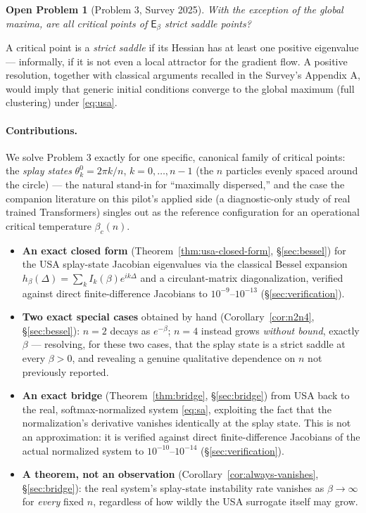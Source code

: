 \documentclass[11pt]{article}
\newtheorem*{openproblem}{Open Problem}
\begin{document}
\begin{openproblem}[Problem 3, Survey 2025]
With the exception of the global maxima, are all critical points of $\mathsf{E}_\beta$ strict saddle points?
\end{openproblem}

A critical point is a \emph{strict saddle} if its Hessian has at least one positive eigenvalue --- informally, if it is not even a local attractor for the gradient flow. A positive resolution, together with classical arguments recalled in the Survey's Appendix A, would imply that generic initial conditions converge to the global maximum (full clustering) under \eqref{eq:usa}.

\paragraph{Contributions.} We solve Problem 3 exactly for one specific, canonical family of critical points: the \emph{splay states} $\theta_k^0 = 2\pi k/n$, $k=0,\dots,n-1$ (the $n$ particles evenly spaced around the circle) --- the natural stand-in for ``maximally dispersed,'' and the case the companion literature on this pilot's applied side (a diagnostic-only study of real trained Transformers) singles out as the reference configuration for an operational critical temperature $\beta_c(n)$.
\begin{itemize}[leftmargin=*]
    \item \textbf{An exact closed form} (Theorem~\ref{thm:usa-closed-form}, \S\ref{sec:bessel}) for the USA splay-state Jacobian eigenvalues via the classical Bessel expansion $h_\beta(\Delta)=\sum_k I_k(\beta)e^{ik\Delta}$ and a circulant-matrix diagonalization, verified against direct finite-difference Jacobians to $10^{-9}$--$10^{-13}$ (\S\ref{sec:verification}).
    \item \textbf{Two exact special cases} obtained by hand (Corollary~\ref{cor:n2n4}, \S\ref{sec:bessel}): $n=2$ decays as $e^{-\beta}$; $n=4$ instead grows \emph{without bound}, exactly $\beta$ --- resolving, for these two cases, that the splay state is a strict saddle at every $\beta>0$, and revealing a genuine qualitative dependence on $n$ not previously reported.
    \item \textbf{An exact bridge} (Theorem~\ref{thm:bridge}, \S\ref{sec:bridge}) from USA back to the real, softmax-normalized system \eqref{eq:sa}, exploiting the fact that the normalization's derivative vanishes identically at the splay state. This is not an approximation: it is verified against direct finite-difference Jacobians of the actual normalized system to $10^{-10}$--$10^{-14}$ (\S\ref{sec:verification}).
    \item \textbf{A theorem, not an observation} (Corollary~\ref{cor:always-vanishes}, \S\ref{sec:bridge}): the real system's splay-state instability rate vanishes as $\beta\to\infty$ for \emph{every} fixed $n$, regardless of how wildly the USA surrogate itself may grow.
\end{itemize}
\end{document}
